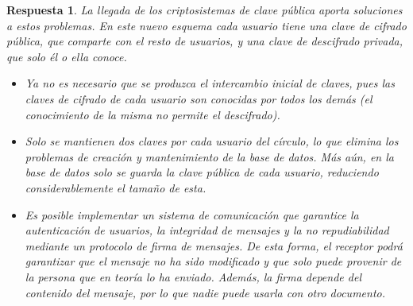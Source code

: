 \documentclass[
  a4paper,
  spanish,
  12pt,
]{scrartcl}
\theoremstyle{ejercicio-style}
\theoremstyle{remark-style}
\newtheorem*{sol}{Respuesta}
\theoremstyle{teorema-style}
\begin{document}
\begin{sol}
La llegada de los criptosistemas de clave pública aporta soluciones a estos problemas. En este nuevo esquema cada usuario tiene una clave de cifrado pública, que comparte con el resto de usuarios, y una clave de descifrado privada, que solo él o ella conoce.

\begin{itemize}
  \item Ya no es necesario que se produzca el intercambio inicial de claves, pues las claves de cifrado de cada usuario son conocidas por todos los demás (el conocimiento de la misma no permite el descifrado).

  \item Solo se mantienen dos claves por cada usuario del círculo, lo que elimina los problemas de creación y mantenimiento de la base de datos. Más aún, en la base de datos solo se guarda la clave pública de cada usuario, reduciendo considerablemente el tamaño de esta.

\item Es posible implementar un sistema de comunicación que garantice la \textit{autenticación} de usuarios, la \textit{integridad} de mensajes y la \textit{no repudiabilidad} mediante un protocolo de firma de mensajes. De esta forma, el receptor podrá garantizar que el mensaje no ha sido modificado y que solo puede provenir de la persona que en teoría lo ha enviado. Además, la firma depende del contenido del mensaje, por lo que nadie puede usarla con otro documento.

\end{itemize}
\end{sol}
\end{document}
